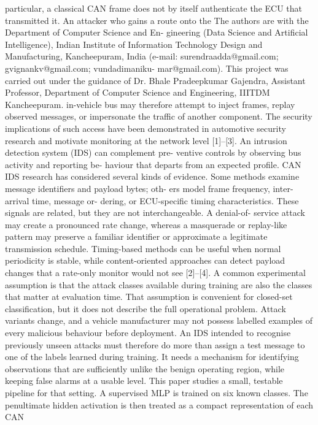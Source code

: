 \documentclass[
]{article}
\begin{document}
particular, a classical CAN frame does not by itself authenticate the
ECU that transmitted it. An attacker who gains a route onto the The
authors are with the Department of Computer Science and En- gineering
(Data Science and Artificial Intelligence), Indian Institute of
Information Technology Design and Manufacturing, Kancheepuram, India
(e-mail: surendraadda@gmail.com; gvignankv@gmail.com; vundadimaniku-
mar@gmail.com). This project was carried out under the guidance of Dr.
Bhale Pradeepkumar Gajendra, Assistant Professor, Department of Computer
Science and Engineering, IIITDM Kancheepuram. in-vehicle bus may
therefore attempt to inject frames, replay observed messages, or
impersonate the traffic of another component. The security implications
of such access have been demonstrated in automotive security research
and motivate monitoring at the network level {[}1{]}--{[}3{]}. An
intrusion detection system (IDS) can complement pre- ventive controls by
observing bus activity and reporting be- haviour that departs from an
expected profile. CAN IDS research has considered several kinds of
evidence. Some methods examine message identifiers and payload bytes;
oth- ers model frame frequency, inter-arrival time, message or- dering,
or ECU-specific timing characteristics. These signals are related, but
they are not interchangeable. A denial-of- service attack may create a
pronounced rate change, whereas a masquerade or replay-like pattern may
preserve a familiar identifier or approximate a legitimate transmission
schedule. Timing-based methods can be useful when normal periodicity is
stable, while content-oriented approaches can detect payload changes
that a rate-only monitor would not see {[}2{]}--{[}4{]}. A common
experimental assumption is that the attack classes available during
training are also the classes that matter at evaluation time. That
assumption is convenient for closed-set classification, but it does not
describe the full operational problem. Attack variants change, and a
vehicle manufacturer may not possess labelled examples of every
malicious behaviour before deployment. An IDS intended to recognise
previously unseen attacks must therefore do more than assign a test
message to one of the labels learned during training. It needs a
mechanism for identifying observations that are sufficiently unlike the
benign operating region, while keeping false alarms at a usable level.
This paper studies a small, testable pipeline for that setting. A
supervised MLP is trained on six known classes. The penultimate hidden
activation is then treated as a compact representation of each CAN
\end{document}
